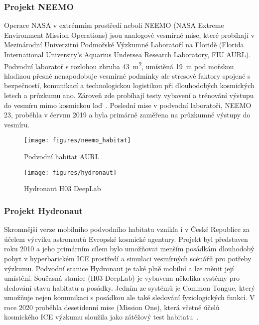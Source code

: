 \subsubsection*{Projekt NEEMO}
Operace \gls{NASA} v extrémním prostředí neboli \gls{NEEMO} (NASA Extreme
Environment Mission Operations) jsou analogové vesmírné mise, které probíhají v
Mezinárodní Univerzitní Podmořské Výzkumné Laboratoří na Floridě (Florida
International University's Aquarius Undersea Research Laboratory, \gls{FIU}
\gls{AURL}). Podvodní laboratoř s rozlohou zhruba \SI{43}{\metre\squared},
umístěná \SI{19}{\metre} pod mořskou hladinou přesně nenapodobuje vesmírné
podmínky ale stresové faktory spojené s bezpečností, komunikací a technologickou
logistikou při dlouhodobých kosmických letech a průzkumu ano. Zároveň zde
probíhají testy vybavení a trénování výstupu do vesmíru mimo kosmickou
loď~\cite{trembanis2012neemo,koutnik2021neemo}. Poslední mise v podvodní
laboratoři, \gls{NEEMO} 23, proběhla v červnu 2019 a byla primárně zaměřena na
průzkumné výstupy do vesmíru.

\begin{figure}[!htb]
    \centering
    \begin{minipage}[b]{.48\linewidth}
        \texttt{[image: figures/neemo\_habitat]}
        \caption{Podvodní habitat AURL~\cite{NASAneemo}}
    \end{minipage}
    \hfill
    \begin{minipage}[b]{.48\linewidth}
        \texttt{[image: figures/hydronaut]}
        \caption{Hydronaut H03 DeepLab~\cite{ESAhydronaut}}
    \end{minipage}
\end{figure}

\subsubsection*{Projekt Hydronaut}
Skromnější verze mobilního podvodního habitatu vznikla i v České Republice za
účelem výcviku astronautů Evropské kosmické agentury. Projekt byl představen
roku 2010 a jeho primárním cílem bylo umožňovat menším posádkám dlouhodobý pobyt
v hyperbarickém \gls{ICE} prostředí a simulaci vesmírných scénářů pro potřeby
výzkumu. Podvodní stanice Hydronaut je také plně mobilní a lze měnit její
umístění. Současná stanice (H03 DeepLab) je vybavena několika systémy pro
sledování stavu habitatu a posádky. Jedním ze systémů je Common Tongue, který
umožňuje nejen komunikaci s posádkou ale také sledování fyziologických funkcí. V
roce 2020 proběhla desetidenní mise (Mission One), která včetně účelů kosmického
\gls{ICE} výzkumu sloužila jako zátěžový test habitatu~\cite{hydronaut2014}.


